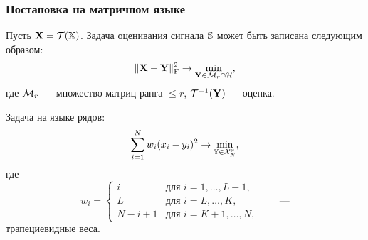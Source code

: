 \documentclass[unicode, notheorems]{beamer}
\begin{document}
\begin{frame}
	\frametitle{Постановка на матричном языке}
	\vspace{-0.2cm}
	Пусть $\mathbf{X} = \mathcal{T}(\mathbb{X})$. Задача оценивания сигнала $\mathbb{S}$ может быть записана следующим образом:
	\begin{equation*}
	\|\mathbf{X} - \mathbf{Y}\|^2_{\mathrm{F}} \to \min_{\substack{\mathbf{Y} \in \mathcal{M}_r \cap \mathcal{H}}},
	\end{equation*}
	где $\mathcal{M}_r$ --- множество матриц ранга $\le r$, $\mathcal{T}^{-1}(\mathbf{Y})$ --- оценка.
	
	Задача на языке рядов:
	\begin{equation*}
	\sum \limits_{i=1}^N w_i(x_i - y_i)^2 \to \min_{\mathbb{Y} \in \mathcal{X}_N^r},
	\end{equation*}
	где	\begin{equation*}
	w_i = \begin{cases}
	i & \text{для $i = 1, \ldots, L-1,$}\\
	L & \text{для $i = L, \ldots, K,$}\\
	N - i + 1 & \text{для $i = K + 1, \ldots, N,$}
	\end{cases} \qquad \text{---}
	\end{equation*}
	трапециевидные веса.
\end{frame}

\end{document}
